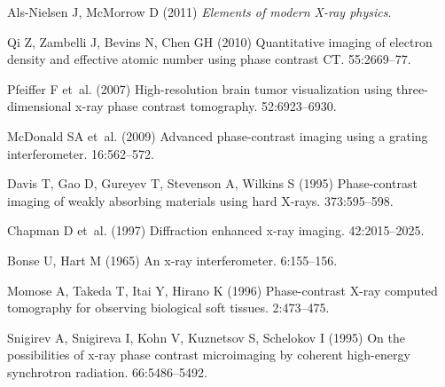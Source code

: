 \documentclass{pnastwo}
\begin{document}
\begin{article}

%
%
\begin{thebibliography}{10}

Als-Nielsen J, McMorrow D (2011) {\em {Elements of modern X-ray physics}}.

Qi Z, Zambelli J, Bevins N, Chen GH (2010) {Quantitative imaging of electron
  density and effective atomic number using phase contrast CT.}
 55:2669--77.

Pfeiffer F et~al. (2007) {High-resolution brain tumor visualization using
  three-dimensional x-ray phase contrast tomography.}
 52:6923--6930.

McDonald SA et~al. (2009) {Advanced phase-contrast imaging using a grating
  interferometer}.
 16:562--572.

Davis T, Gao D, Gureyev T, Stevenson A, Wilkins S (1995) {Phase-contrast
  imaging of weakly absorbing materials using hard X-rays}.
 373:595--598.

Chapman D et~al. (1997) {Diffraction enhanced x-ray imaging}.
 42:2015--2025.

Bonse U, Hart M (1965) {An x-ray interferometer}.
 6:155--156.

Momose A, Takeda T, Itai Y, Hirano K (1996) {Phase-contrast X-ray computed
  tomography for observing biological soft tissues}.
 2:473--475.

Snigirev A, Snigireva I, Kohn V, Kuznetsov S, Schelokov I (1995) {On the
  possibilities of x-ray phase contrast microimaging by coherent high-energy
  synchrotron radiation}.
 66:5486--5492.


\end{thebibliography}
\end{article}
\end{document}
